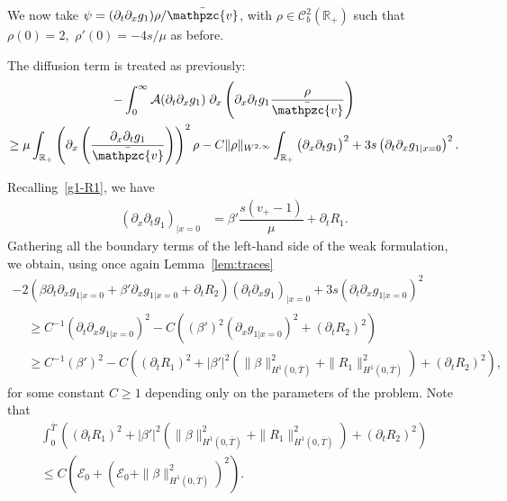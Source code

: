 \documentclass[AHL,Unicode,longabstracts,published]{cedram}
\newcommand{\R}{\mathbb{R}}
\newcommand{\p}{\partial}
\newcommand{\bv}{\bar{\mathpzc{v}}}
\newcommand{\cA}{\mathcal A}
\newcommand{\cE}{\mathcal E}
\newcommand{\cC}{\mathcal C}
\begin{document}
We now take $\psi=(\partial_t \partial_x g_1) \rho/\bv$, with $\rho\in \cC^2_b(\R_+)$ such that $\rho(0)=2,$ $\rho'(0)=-4s/\mu$ as before.

The diffusion term is treated as previously:
\begin{multline*}
-\int_0^\infty \cA(\p_t\p_x g_1)\; \p_x \left(\p_x \partial_t g_1 \dfrac{\rho}{\bv}\right)\\
\geq \mu \int_{\R_+} \left(\partial_x \left(\dfrac{\partial_x \partial_t g_1}{\bv} \right) \right)^2 \rho
- C \|\rho\|_{W^{2,\infty}} \int_{\R_+} \big(\partial_x \partial_t g_1\big)^2+ 3s \left(\partial_t \p_x g_{1|x=0}\right)^2.
\end{multline*}

Recalling~\eqref{g1-R1}, we have
\begin{align}
(\partial_x \partial_t g_1)_{|x=0} & = \beta' \dfrac{s (v_+ -1)}{\mu} + \partial_t R_1.
\end{align}
Gathering all the boundary terms of the left-hand side of the weak formulation, we obtain, using once again Lemma~\ref{lem:traces}
\begin{multline*}
-2\left(\beta\p_t\p_x g_{1|x=0} + \beta' \p_xg_{1|x=0} + \p_t R_2\right)\left(\partial_t \partial_x g_1\right)_{|x=0} + 3s \left(\partial_t \p_x g_{1|x=0}\right)^2 \\
\begin{aligned}
&\geq C^{-1} \left(\partial_t \p_x g_{1|x=0}\right)^2 - C \left((\beta')^2 \left(\p_xg_{1|x=0}\right)^2 + \left(\p_t R_2\right)^2\right)\\
&\geq C^{-1} (\beta')^2 - C \left(\left(\p_t R_1\right)^2 + |\beta'|^2 \left(\|\beta\|_{H^1\left(0,\overline{T}\right)}^2 + \|R_1\|_{H^1\left(0,\overline{T}\right)}^2\right) + (\p_t R_2)^2\right),
\end{aligned}
\end{multline*}
for some constant $C\geq 1$ depending only on the parameters of the problem. Note that
\begin{multline*}
\int_0^{\overline{T}} \left(\left(\p_t R_1\right)^2 + |\beta'|^2 \left(\|\beta\|_{H^1\left(0,\overline{T}\right)}^2 + \|R_1\|_{H^1\left(0,\overline{T}\right)}^2\right) +\left(\p_t R_2\right)^2\right)\\
\leq C\left(\cE_0 + \left(\cE_0+ \|\beta\|_{H^1\left(0,\overline{T}\right)}^2\right)^2 \right).
\end{multline*}
\end{document}
